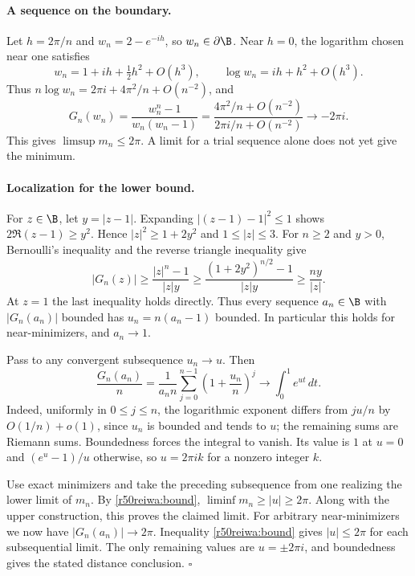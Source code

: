 \documentclass[11pt,a4paper]{article}
\numberwithin{equation}{section}
\theoremstyle{definition}
\theoremstyle{remark}
\begin{document}
\paragraph{A sequence on the boundary.}
Let \(h=2\pi/n\) and \(w_n=2-e^{-ih}\), so \(w_n\in\partial\B\). Near \(h=0\), the logarithm chosen near one satisfies
\[
 w_n=1+ih+\tfrac12 h^2+O(h^3),\qquad
 \log w_n=ih+h^2+O(h^3).
\]
Thus \(n\log w_n=2\pi i+4\pi^2/n+O(n^{-2})\), and
\[
  G_n(w_n)=\frac{w_n^n-1}{w_n(w_n-1)}
       =\frac{4\pi^2/n+O(n^{-2})}{2\pi i/n+O(n^{-2})}
       \longrightarrow-2\pi i.
\]
This gives \(\limsup m_n\le2\pi\). A limit for a trial sequence alone does not yet give the minimum.

\paragraph{Localization for the lower bound.}
For \(z\in\B\), let \(y=|z-1|\). Expanding \(|(z-1)-1|^2\le1\) shows \(2\Re(z-1)\ge y^2\). Hence \(|z|^2\ge1+2y^2\) and \(1\le |z|\le3\). For \(n\ge2\) and \(y>0\), Bernoulli's inequality and the reverse triangle inequality give
\begin{equation}\label{r50reiwa:bound}
 |G_n(z)|\ge\frac{|z|^n-1}{|z|y}
 \ge\frac{(1+2y^2)^{n/2}-1}{|z|y}
 \ge\frac{ny}{|z|}.
\end{equation}
At \(z=1\) the last inequality holds directly. Thus every sequence \(a_n\in\B\) with \(|G_n(a_n)|\) bounded has \(u_n=n(a_n-1)\) bounded. In particular this holds for near-minimizers, and \(a_n\to1\).

Pass to any convergent subsequence \(u_n\to u\). Then
\[
 \frac{G_n(a_n)}{n}
   =\frac1{a_n n}\sum_{j=0}^{n-1}\left(1+\frac{u_n}{n}\right)^j
    \longrightarrow \int_0^1 e^{ut}\,dt.
\]
Indeed, uniformly in \(0\le j\le n\), the logarithmic exponent differs from \(ju/n\) by \(O(1/n)+o(1)\), since \(u_n\) is bounded and tends to \(u\); the remaining sums are Riemann sums. Boundedness forces the integral to vanish. Its value is \(1\) at \(u=0\) and \((e^u-1)/u\) otherwise, so \(u=2\pi ik\) for a nonzero integer \(k\).

Use exact minimizers and take the preceding subsequence from one realizing the lower limit of \(m_n\). By \eqref{r50reiwa:bound}, \(\liminf m_n\ge |u|\ge2\pi\). Along with the upper construction, this proves the claimed limit. For arbitrary near-minimizers we now have \(|G_n(a_n)|\to2\pi\). Inequality \eqref{r50reiwa:bound} gives \(|u|\le2\pi\) for each subsequential limit. The only remaining values are \(u=\pm2\pi i\), and boundedness gives the stated distance conclusion. \hfill\(\square\)
\end{document}
